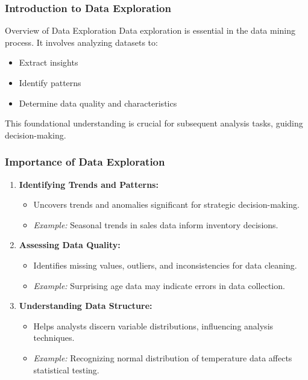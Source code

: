 \documentclass[aspectratio=169]{beamer}
\begin{document}
\frame{\titlepage}

\begin{frame}[fragile]
    \frametitle{Introduction to Data Exploration}
    \begin{block}{Overview of Data Exploration}
        Data exploration is essential in the data mining process. It involves analyzing datasets to:
        \begin{itemize}
            \item Extract insights
            \item Identify patterns
            \item Determine data quality and characteristics
        \end{itemize}
        This foundational understanding is crucial for subsequent analysis tasks, guiding decision-making.
    \end{block}
\end{frame}

\begin{frame}[fragile]
    \frametitle{Importance of Data Exploration}
    \begin{enumerate}
        \item \textbf{Identifying Trends and Patterns:}
            \begin{itemize}
                \item Uncovers trends and anomalies significant for strategic decision-making.
                \item \emph{Example:} Seasonal trends in sales data inform inventory decisions.
            \end{itemize}

        \item \textbf{Assessing Data Quality:}
            \begin{itemize}
                \item Identifies missing values, outliers, and inconsistencies for data cleaning.
                \item \emph{Example:} Surprising age data may indicate errors in data collection.
            \end{itemize}

        \item \textbf{Understanding Data Structure:}
            \begin{itemize}
                \item Helps analysts discern variable distributions, influencing analysis techniques.
                \item \emph{Example:} Recognizing normal distribution of temperature data affects statistical testing.
            \end{itemize}
    \end{enumerate}
\end{frame}
\end{document}
